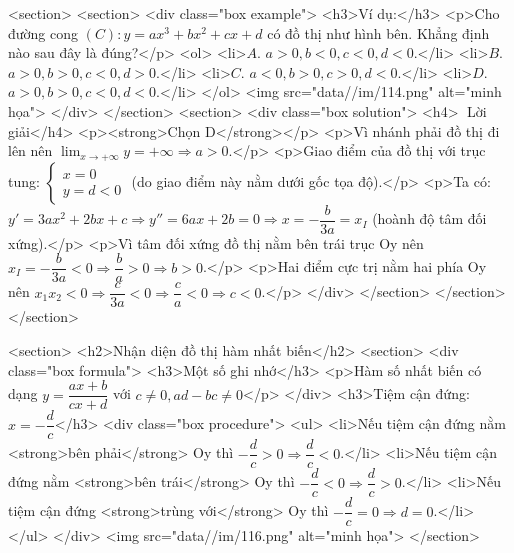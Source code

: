     <section>
        <section>
            <div class="box example">
                <h3>Ví dụ:</h3>
                <p>Cho đường cong \((C): y = ax^3 + bx^2 + cx + d\) có đồ thị như hình bên. Khẳng định nào sau đây là đúng?</p>
                <ol>
                    <li>\(A.\) \(a > 0, b < 0, c < 0, d < 0\).</li>
                    <li>\(B.\) \(a > 0, b > 0, c < 0, d > 0\).</li>
                    <li>\(C.\) \(a < 0, b > 0, c > 0, d < 0\).</li>
                    <li>\(D.\) \(a > 0, b > 0, c < 0, d < 0\).</li>
                </ol>
                <img src="data//im/114.png" alt="minh họa">
            </div>
        </section>
        <section>
            <div class="box solution">
                <h4>📝 Lời giải</h4>
                <p><strong>Chọn D</strong></p>
                <p>Vì nhánh phải đồ thị đi lên nên \(\lim_{x \to +\infty} y = +\infty \Rightarrow \boxed{a > 0}\).</p>
                <p>Giao điểm của đồ thị với trục tung: \(\begin{cases} x = 0 \\ y = d < 0 \end{cases}\) (do giao điểm này nằm dưới gốc tọa độ).</p>
                <p>Ta có: \(y' = 3ax^2 + 2bx + c \Rightarrow y'' = 6ax + 2b = 0 \Rightarrow x = -\dfrac{b}{3a} = x_I\) (hoành độ tâm đối xứng).</p>
                <p>Vì tâm đối xứng đồ thị nằm bên trái trục Oy nên \(x_I = -\dfrac{b}{3a} < 0 \Rightarrow \dfrac{b}{a} > 0 \Rightarrow \boxed{b > 0}\).</p>
                <p>Hai điểm cực trị nằm hai phía Oy nên \(x_1x_2 < 0 \Rightarrow \dfrac{c}{3a} < 0 \Rightarrow \dfrac{c}{a} < 0 \Rightarrow \boxed{c < 0}\).</p>
            </div>
        </section>
    </section>
</section>

<section>
    <h2>Nhận diện đồ thị hàm nhất biến</h2>
    <section>
        <div class="box formula">
            <h3>Một số ghi nhớ</h3>
            <p>Hàm số nhất biến có dạng \(y = \dfrac{ax+b}{cx+d}\) với \(c \ne 0, ad - bc \ne 0\)</p>
        </div>
        <h3>Tiệm cận đứng: \(x = -\dfrac{d}{c}\)</h3>
        <div class="box procedure">
            <ul>
                <li>Nếu tiệm cận đứng nằm <strong>bên phải</strong> Oy thì \(-\dfrac{d}{c} > 0 \Rightarrow \dfrac{d}{c} < 0\).</li>
                <li>Nếu tiệm cận đứng nằm <strong>bên trái</strong> Oy thì \(-\dfrac{d}{c} < 0 \Rightarrow \dfrac{d}{c} > 0\).</li>
                <li>Nếu tiệm cận đứng <strong>trùng với</strong> Oy thì \(-\dfrac{d}{c} = 0 \Rightarrow d = 0\).</li>
            </ul>
        </div>
        <img src="data//im/116.png" alt="minh họa">
    </section>

